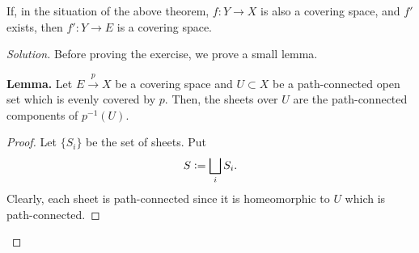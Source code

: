 \documentclass[12pt]{article}
\newenvironment{blockquote}
{\begin{mdframed}[skipabove=0pt, skipbelow=0pt, innertopmargin=4pt, innerbottommargin=4pt, bottomline=false,topline=false,rightline=false, linewidth=2pt]}
{\end{mdframed}}
\newenvironment{soln}{\begin{proof}[Solution]}{\end{proof}}
\begin{document}
\begin{exe} \label{exe:alsocoveringspace}
	If, in the situation of the above theorem, $f:Y\to X$ is also a covering space, and $f'$ exists, then $f':Y \to E$ is a covering space. 
\end{exe}
\begin{soln} 
	Before proving the exercise, we prove a small lemma.\\
	\begin{blockquote}
		\textbf{Lemma.} Let $E\overset{p}{\longrightarrow}X$ be a covering space and $U \subset X$ be a path-connected open set which is evenly covered by $p.$ Then, the sheets over $U$ are the path-connected components of $p^{-1}(U).$
		\begin{proof} 
			Let $\{S_i\}$ be the set of sheets. Put 
			\begin{equation*} 
				S \vcentcolon= \bigsqcup_{i} S_i.
			\end{equation*}
			Clearly, each sheet is path-connected since it is homeomorphic to $U$ which is path-connected. 


\end{proof}
\end{blockquote}
\end{soln}
\end{document}
